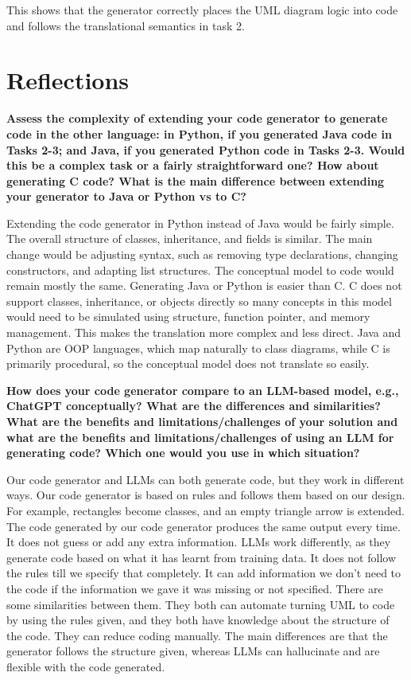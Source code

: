 This shows that the generator correctly places the UML diagram logic into code and follows the translational semantics in task 2. 


\newpage

\section{Reflections}

\textbf{Assess the complexity of extending your code generator to generate code in the other language: in Python, if you generated Java code in Tasks 2-3; and Java, if you generated Python code in Tasks 2-3. Would this be a complex task or a fairly straightforward one? How about generating C code? What is the main difference between extending your generator to Java or Python vs to C?}

Extending the code generator in Python instead of Java would be fairly simple. The overall structure of classes, inheritance, and fields is similar. The main change would be adjusting syntax, such as removing type declarations, changing constructors, and adapting list structures. The conceptual model to code would remain mostly the same. 
Generating Java or Python is easier than C. C does not support classes, inheritance, or objects directly so many concepts in this model would need to be simulated using structure, function pointer, and memory management. This makes the translation more complex and less direct. Java and Python are OOP languages, which map naturally to class diagrams, while C is primarily procedural, so the conceptual model does not translate so easily. 

\textbf{How does your code generator compare to an LLM-based model, e.g., ChatGPT
conceptually? What are the differences and similarities? What are the benefits and limitations/challenges of your solution and what are the benefits and
limitations/challenges of using an LLM for generating code? Which one would you use in which situation?}

Our code generator and LLMs can both generate code, but they work in different ways. Our code generator is based on rules and follows them based on our design. For example, rectangles become classes, and an empty triangle arrow is extended. The code generated by our code generator produces the same output every time. It does not guess or add any extra information. LLMs work differently, as they generate code based on what it has learnt from training data. It does not follow the rules till we specify that completely. It can add information we don’t need to the code if the information we gave it was missing or not specified. 
There are some similarities between them. They both can automate turning UML to code by using the rules given, and they both have knowledge about the structure of the code. They can reduce coding manually. The main differences are that the generator follows the structure given, whereas LLMs can hallucinate and are flexible with the code generated. 

